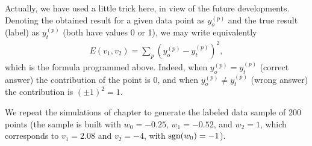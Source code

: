 \documentclass[a4paper,12pt,polish]{jupyterBook}
\begin{document}
\sphinxAtStartPar
Actually, we have used a little trick here, in view of the future developments. Denoting the obtained result for a given data point as \(y_o^{(p)}\) and the true result (label) as \(y_t^{(p)}\) (both have values 0 or 1), we may write equivalently
\begin{equation*}
\begin{split} E(v_1,v_2)=\sum_p \left ( y_o^{(p)}-y_t^{(p)}\right )^2,\end{split}
\end{equation*}
\sphinxAtStartPar
which is the formula programmed above. Indeed, when  \(y_o^{(p)}=y_t^{(p)}\) (correct answer) the contribution of the point is 0, and when \(y_o^{(p)}\neq y_t^{(p)}\) (wrong answer) the contribution is \((\pm 1)^2=1\).

\sphinxAtStartPar
We repeat the simulations of chapter {\hyperref[\detokenize{docs/perceptron:perc-lab}]{}} to generate the labeled data sample  of 200 points (the sample is built with \(w_0=-0.25\), \(w_1=-0.52\), and \(w_2=1\), which corresponds to \(v_1=2.08\) and \(v_2=-4\), with \({\rm sgn}(w_0)=-1\)).
\end{document}
